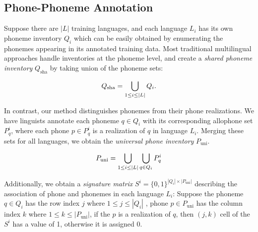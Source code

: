 \documentclass{article}
\newcommand{\gn}[1]{\textcolor{magenta}{\small [#1 --GN]}}
\newcommand{\drm}[1]{\textcolor{orange}{\small [#1 ---DRM]}}
\begin{document}
\subsection{Phone-Phoneme Annotation}
Suppose there are $|L|$ training languages, and each language $L_i$ has its own phoneme inventory $Q_{i}$ which can be easily obtained by enumerating the phonemes appearing in its annotated training data.
Most traditional multilingual approaches handle inventories at the phoneme level, and create a \textit{shared phoneme inventory} $Q_{\text{sha}}$ by taking union of the phoneme sets:

\begin{equation}
    \small
    Q_{\text{sha}} = \bigcup_{1 \leq i \leq |L| } Q_i.
\end{equation}

In contrast, our method distinguishes phonemes from their phone realizations.
We have linguists annotate each phoneme $q \in Q_{i}$ with its corresponding allophone set $P^i_q$, where each phone $p \in P^i_q$ is a realization of $q$ in language $L_i$.
Merging these sets for all languages, we obtain the \textit{universal phone inventory} $P_{\text{uni}}$.

\begin{equation}
    \small
    P_{\text{uni}} = \bigcup_{1 \leq i \leq |L| } \bigcup_{q \in Q_{i}} P^i_q
\end{equation}

Additionally, we obtain a \textit{signature matrix} $S^i = \{0, 1\}^{|Q_i| \times |P_{\text{uni}}|} $ describing the association of phone and phonemes in each language $L_i$: Suppose the phoneme $q \in Q_i$ has the row index $j$ where $1 \leq j \leq |Q_i|$ , phone $p \in P_{\text{uni}}$ has the column index $k$ where $1 \leq k \leq |P_{\text{uni}}|$, if the $p$ is a realization of $q$, then $(j,k)$ cell of the $S^i$ has a value of 1, otherwise it is assigned 0.

\end{document}
